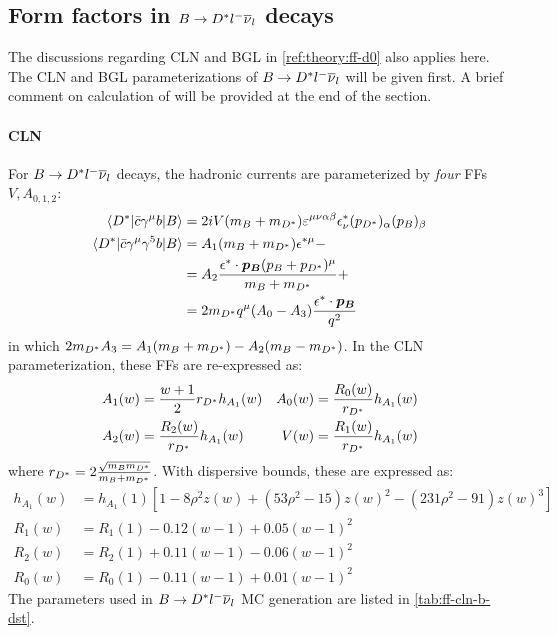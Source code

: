 \subsection{Form factors in $B \rightarrow {\ensuremath{{D}^*}}{\ensuremath{l^-}}{\ensuremath{{\overline{\nu}}_l}}$ decays}
\label{ref:theory:ff-dst}

The discussions regarding CLN and BGL in \cref{ref:theory:ff-d0} also applies
here.
The CLN and BGL parameterizations of $B \rightarrow {\ensuremath{{D}^*}}{\ensuremath{l^-}}{\ensuremath{{\overline{\nu}}_l}}$ will be
given first.
A brief comment on calculation of \RDX will be provided at the end of the
section.

\paragraph{CLN}
For $B \rightarrow {\ensuremath{{D}^*}}{\ensuremath{l^-}}{\ensuremath{{\overline{\nu}}_l}}$ decays,
the hadronic currents are parameterized by \emph{four} FFs $V, A_{0,1,2}$:
\begin{align}
    \langle{\ensuremath{{D}^*}}\rvert \bar{c} \gamma^\mu b \lvert B\rangle
    =\hphantom{ } &
        2i V (m_B + m_{{D}^*}) \varepsilon^{\mu\nu\alpha\beta}
        \epsilon^*_\nu (p_{{D}^*})_\alpha (p_B)_\beta \\
    \langle{\ensuremath{{D}^*}}\rvert \bar{c} \gamma^\mu \gamma^5 b \lvert B\rangle
    =\hphantom{ } &
        A_1 (m_B + m_{{D}^*}) \epsilon^{*\mu} -
        \nonumber \\
    =\hphantom{ } &
        A_2 \frac{\epsilon^* \cdot \bm{p_B} (p_B + p_{{D}^*})^\mu}{m_B + m_{{D}^*}} +
        \nonumber \\
    =\hphantom{ } &
        2 m_{{D}^*} q^\mu (A_0 - A_3) \frac{\epsilon^* \cdot \bm{p_B}}{q^2}
\end{align}
in which $2 m_{{D}^*} A_3 = A_1(m_B + m_{{D}^*}) - A_2(m_B - m_{{D}^*})$.
In the CLN parameterization,
these FFs are re-expressed as:
\begin{align}
    & A_1(w) = \frac{w+1}{2} r_{{D}^*} h_{A_1}(w)
    & A_0(w) = \frac{R_0(w)}{r_{{D}^*}} h_{A_1}(w)
    \label{eqn:b-dst-ff-param-1} \\
    & A_2(w) = \frac{R_2(w)}{r_{{D}^*}} h_{A_1}(w)
    & V(w) = \frac{R_1(w)}{r_{{D}^*}} h_{A_1}(w)
    \label{eqn:b-dst-ff-param-2}
\end{align}
where $r_{{D}^*} = 2 \frac{\sqrt{m_B m_{{D}^*}}}{m_B + m_{{D}^*}}$.
With dispersive bounds, these are expressed as:
\begin{align}
    h_{A_1}(w) &= h_{A_1}(1) \left[
        1 - 8 \rho^2 z(w) + (53 \rho^2 - 15) z(w)^2 - (231 \rho^2 - 91) z(w)^3
    \right] \\
    R_1(w) &= R_1(1) - 0.12(w-1) + 0.05(w-1)^2 \\
    R_2(w) &= R_2(1) + 0.11(w-1) - 0.06(w-1)^2 \\
    R_0(w) &= R_0(1) - 0.11(w-1) + 0.01(w-1)^2
\end{align}
The parameters used in $B \rightarrow {\ensuremath{{D}^*}}{\ensuremath{l^-}}{\ensuremath{{\overline{\nu}}_l}}$ MC generation are
listed in \cref{tab:ff-cln-b-dst}.

